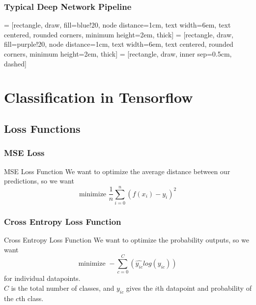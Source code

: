 \documentclass{beamer}
\begin{document}
\begin{frame}
  \frametitle{Typical Deep Network Pipeline}
   = [rectangle, draw, fill=blue!20, node distance=1cm, text width=6em, text centered, rounded corners, minimum height=2em, thick]
   = [rectangle, draw, fill=purple!20, node distance=1cm, text width=6em, text centered, rounded corners, minimum height=2em, thick]
   = [rectangle, draw, inner sep=0.5cm, dashed]

\end{frame}


\section{Classification in Tensorflow}
\subsection{Loss Functions}
\begin{frame}
  \frametitle{MSE Loss}
  \begin{block}{MSE Loss Function}
    We want to optimize the average distance between our predictions, so we want \\
    $$\text{minimize } \frac{1}{n}\sum_{i=0}^{n}(f(x_i) - y_i)^2$$
  \end{block}
\end{frame}
\begin{frame}
  \frametitle{Cross Entropy Loss Function}
  \begin{block}{Cross Entropy Loss Function}
    We want to optimize the probability outputs, so we want \\
    $$\text{minimize } -\sum_{c=0}^C(\hat{y_{ic}}log(y_{ic}))$$
    for individual datapoints. \\
    $C$ is the total number of classes, and $y_{ic}$ gives the $i$th datapoint and probability of the $c$th class.
  \end{block}
\end{frame}
\end{document}
